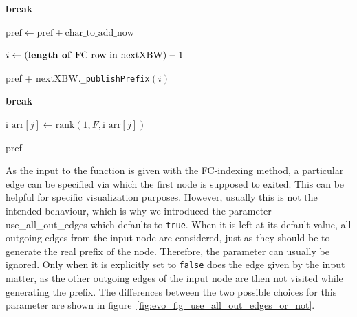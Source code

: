 \documentclass[a4paper,12pt,twoside,BCOR=10mm]{scrbook}
\begin{document}
\begin{algorithm}
\begin{algorithmic}[1]
		\State \textbf{break}

	\Else

		\State $ \textrm{pref} \gets \textrm{pref} + \textrm{char\_to\_add\_now} $


			\State $ i \gets (\textrm{\textbf{length of} FC row in nextXBW}) - 1 $

			\State \Return pref + nextXBW.\texttt{\_publishPrefix}$( i )$
		\EndIf
	\EndIf

		\State \textbf{break}
	\EndIf

		\State $ \textrm{i\_arr}[ j ] \gets \textrm{rank}(1, F, \textrm{i\_arr}[ j ]) $
	\EndFor
\EndFor

\State \Return pref

\end{algorithmic}
\end{algorithm}
As the input to the function is given with the FC-indexing method, a particular edge can be specified
via which the first node is supposed to exited. This can be helpful for specific visualization purposes.
However, usually this is not the intended behaviour, which is why we introduced the parameter
use\_all\_out\_edges which defaults to \texttt{true}.
When it is left at its default value, all outgoing edges from the input node are considered,
just as they should be to generate the real prefix of the node. Therefore, the parameter can usually be ignored.
Only when it is explicitly set to \texttt{false} does the edge given by the input matter,
as the other outgoing edges of the input node are then not visited while generating the prefix.
The differences between the two possible choices for this parameter
are shown in figure~\ref{fig:evo_fig_use_all_out_edges_or_not}. \\
\end{document}
